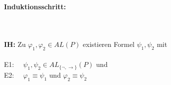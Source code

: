     \paragraph{Induktionsschritt:} \ \\\\
    \noindent\hspace*{5mm}
    \textbf{IH:}  \quad Zu $\varphi_1, \varphi_2 \in AL(P)$ existieren Formel $\psi_1, \psi_2$ mit \\\\
    \noindent\hspace*{10mm}
    E1: $\quad \psi_1, \psi_2 \in AL_{\{\neg,\to\}}(P)$ und \\
    \noindent\hspace*{10mm}
    E2: $\quad \varphi_1 \equiv \psi_1$ und $\varphi_2 \equiv \psi_2$ \\
    
